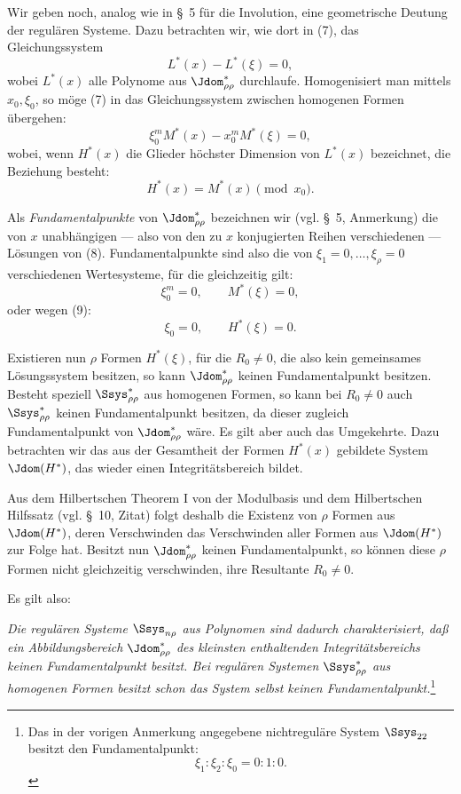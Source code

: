 \documentclass[11pt]{article}
\begin{document}
Wir geben noch, analog wie in \S\ 5 für die Involution, eine geometrische Deutung der regulären Systeme. Dazu betrachten wir, wie dort in (7), das Gleichungssystem
\begin{equation}
  L^*(x)-L^*(\xi)=0,
\tag{7}
\end{equation}
wobei $L^*(x)$ alle Polynome aus $\Jdom^*_{\rho\rho}$ durchlaufe. Homogenisiert man mittels $x_0,
\xi_0$, so möge (7) in das Gleichungssystem zwischen homogenen Formen übergehen:
\begin{equation}
  \xi_0^{m}M^*(x)-x_0^{m}M^*(\xi)=0,
\tag{8}
\end{equation}
wobei, wenn $H^*(x)$ die Glieder höchster Dimension von $L^*(x)$ bezeichnet, die Beziehung besteht:
\begin{equation}
  H^*(x)=M^*(x)\pmod{x_0}.
\tag{9}
\end{equation}

Als \emph{Fundamentalpunkte} von $\Jdom^*_{\rho\rho}$ bezeichnen wir (vgl. \S\ 5, Anmerkung) die von $x$ unabhängigen --- also von den zu $x$ konjugierten Reihen verschiedenen --- Lösungen von (8). Fundamentalpunkte sind also die von $\xi_1=0,
\ldots,
\xi_\rho=0$ verschiedenen Wertesysteme, für die gleichzeitig gilt:
\[
  \xi_0^m=0,\qquad M^*(\xi)=0,
\]
oder wegen (9):
\[
  \xi_0=0,
  \qquad H^*(\xi)=0.
\]

Existieren nun $\rho$ Formen $H^*(\xi)$, für die $R_0\ne0$, die also kein gemeinsames Lösungssystem besitzen, so kann $\Jdom^*_{\rho\rho}$ keinen Fundamentalpunkt besitzen. Besteht speziell $\Ssys^*_{\rho\rho}$ aus homogenen Formen, so kann bei $R_0\ne0$ auch $\Ssys^*_{\rho\rho}$ keinen Fundamentalpunkt besitzen, da dieser zugleich Fundamentalpunkt von $\Jdom^*_{\rho\rho}$ wäre. Es gilt aber auch das Umgekehrte. Dazu betrachten wir das aus der Gesamtheit der Formen $H^*(x)$ gebildete System $\Jdom(H^*)$, das wieder einen Integritätsbereich bildet.

Aus dem Hilbertschen Theorem I von der Modulbasis und dem Hilbertschen Hilfssatz (vgl. \S\ 10, Zitat) folgt deshalb die Existenz von $\rho$ Formen aus $\Jdom(H^*)$, deren Verschwinden das Verschwinden aller Formen aus $\Jdom(H^*)$ zur Folge hat. Besitzt nun $\Jdom^*_{\rho\rho}$ keinen Fundamentalpunkt, so können diese $\rho$ Formen nicht gleichzeitig verschwinden, ihre Resultante $R_0\ne0$.

Es gilt also:

\emph{Die regulären Systeme $\Ssys_{n\rho}$ aus Polynomen sind dadurch charakterisiert, daß ein Abbildungsbereich $\Jdom^*_{\rho\rho}$ des kleinsten enthaltenden Integritätsbereichs keinen Fundamentalpunkt besitzt. Bei regulären Systemen $\Ssys^*_{\rho\rho}$ aus homogenen Formen besitzt schon das System selbst keinen Fundamentalpunkt.}\footnote{Das in der vorigen Anmerkung angegebene nichtreguläre System $\Ssys_{22}$ besitzt den Fundamentalpunkt:
\[
  \xi_1:\xi_2:\xi_0=0:1:0.
\]}
\end{document}
